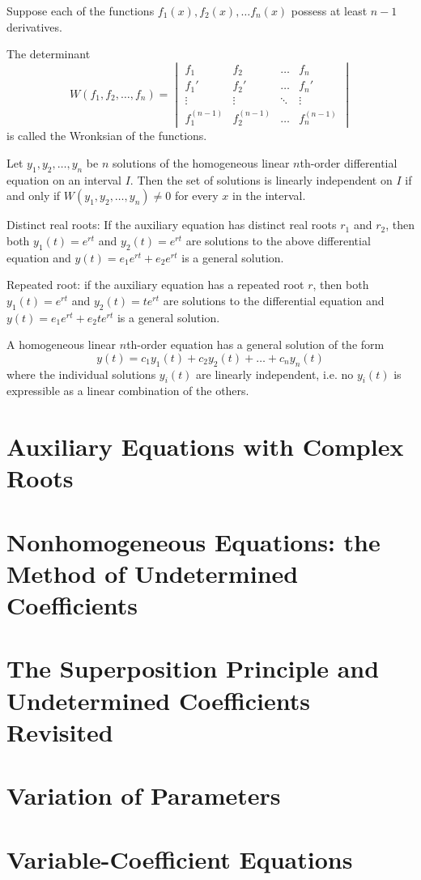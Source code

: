 \documentclass[../diffeq.tex]{subfiles}
\begin{document}
\begin{definition}[Wronksian]
    Suppose each of the functions $f_1(x),f_2(x),\dots f_n(x)$ possess at least $n-1$ derivatives. 
    
    The determinant \[
        W(f_1, f_2, \dots, f_n) =
        \begin{vmatrix}
        f_1 & f_2 & \dots & f_n \\
        f_1' & f_2' & \dots & f_n' \\
        \vdots & \vdots & \ddots & \vdots \\
        f_1^{(n-1)} & f_2^{(n-1)} & \dots & f_n^{(n-1)}
        \end{vmatrix}
        \]
        is called the Wronksian of the functions.
\end{definition}

\begin{theorem}
    Let $y_1,y_2,\dots,y_n$ be $n$ solutions of the homogeneous linear $n$th-order differential equation on an interval $I$. Then the set of solutions is linearly independent on $I$ 
    if and only if $W(y_1,y_2,\dots,y_n)\neq 0$ for every $x$ in the interval.
\end{theorem}

Distinct real roots: If the auxiliary equation has distinct real roots $r_1$ and $r_2$, then both $y_1(t)=e^{rt}$ and $y_2(t)=e^{rt}$ are solutions to the above differential equation and $y(t)=e_1e^{rt}+e_2e^{rt}$ is a general solution.

Repeated root: if the auxiliary equation has a repeated root $r$, then both $y_1(t)=e^{rt}$ and $y_2(t)=te^{rt}$ are solutions to the differential equation and $y(t)=e_1e^{rt}+e_2te^{rt}$ is a general solution.

A homogeneous linear $n$th-order equation has a general solution of the form 
\[ y(t)=c_1y_1(t)+c_2y_2(t)+\dots+c_ny_n(t) \]
where the individual solutions $y_i(t)$ are linearly independent, i.e. no $y_i(t)$ is expressible as a linear combination of the others.

\section{Auxiliary Equations with Complex Roots}
\section{Nonhomogeneous Equations: the Method of Undetermined Coefficients}
\section{The Superposition Principle and Undetermined Coefficients Revisited}
\section{Variation of Parameters}
\section{Variable-Coefficient Equations}
\end{document}
